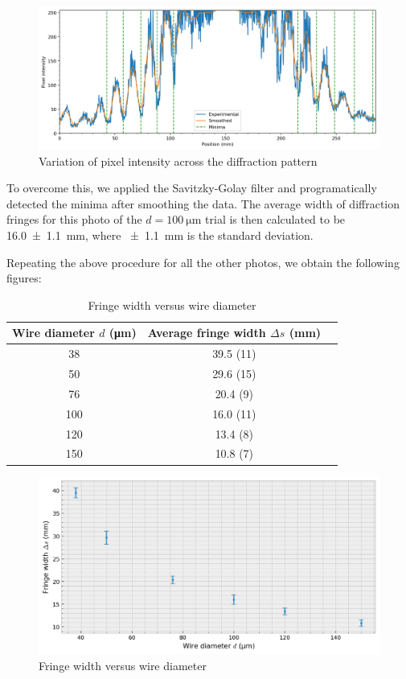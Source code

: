 \documentclass[a4paper, 12pt]{article}
\begin{document}
\begin{figure}[H]
    \includegraphics[width=\textwidth]{scripts/processed-data/intensity}
    \caption{Variation of pixel intensity across the diffraction pattern}
    \label{fig:intensity}
\end{figure}

To overcome this, we applied the Savitzky-Golay filter \autocite{scipy_smooth_filter} and programatically detected the minima after smoothing the data. 
The average width of diffraction fringes for this photo of the $d = \SI{100}{\um}$ trial is then calculated to be \SI{16.0+-1.1}{\mm}, where \SI{+-1.1}{\mm} is the standard deviation.

Repeating the above procedure for all the other photos, we obtain the following figures:

\begin{table}[H]
    \centering
    \caption{Fringe width versus wire diameter}
    \begin{tabular}{ |c|c|c| }
        \hline
        \textbf{Wire diameter $d$} (\si{\um}) &
        \textbf{Average fringe width $\Delta s$} (\si{\mm}) \\
        \hline
\num{ 38 } & \num{ 39.5 (11) } \\ \hline
\num{ 50 } & \num{ 29.6 (15) } \\ \hline
\num{ 76 } & \num{ 20.4 (9) } \\ \hline
\num{ 100 } & \num{ 16.0 (11) } \\ \hline
\num{ 120 } & \num{ 13.4 (8) } \\ \hline
\num{ 150 } & \num{ 10.8 (7) } \\ \hline
    \end{tabular}
\end{table}

\begin{figure}[H]
    \centering
    \includegraphics[width=\textwidth]{scripts/processed-data/ds_vs_d}
    \caption{Fringe width versus wire diameter}
    \label{fig:ds_vs_d}
\end{figure}

\printbibliography
\end{document}
